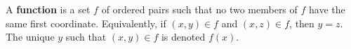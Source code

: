 A \textbf{function} is a set $f$ of ordered pairs such that no two members of $f$ have the same first coordinate. Equivalently, if $(x,y) \in f$ and $(x,z) \in f$, then $y = z$. The unique $y$ such that $(x,y) \in f$ is denoted $f(x)$.
